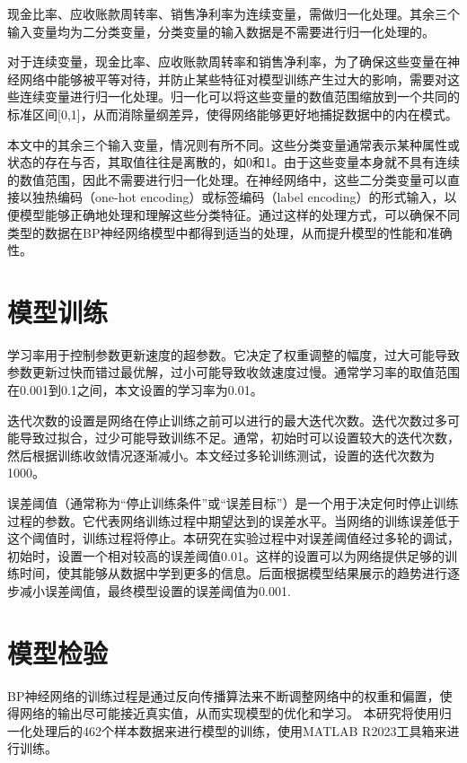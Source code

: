 现金比率、应收账款周转率、销售净利率为连续变量，需做归一化处理。其余三个输入变量均为二分类变量，分类变量的输入数据是不需要进行归一化处理的。

对于连续变量，现金比率、应收账款周转率和销售净利率，为了确保这些变量在神经网络中能够被平等对待，并防止某些特征对模型训练产生过大的影响，需要对这些连续变量进行归一化处理。归一化可以将这些变量的数值范围缩放到一个共同的标准区间[0,1]，从而消除量纲差异，使得网络能够更好地捕捉数据中的内在模式。

本文中的其余三个输入变量，情况则有所不同。这些分类变量通常表示某种属性或状态的存在与否，其取值往往是离散的，如0和1。由于这些变量本身就不具有连续的数值范围，因此不需要进行归一化处理。在神经网络中，这些二分类变量可以直接以独热编码（one-hot encoding）或标签编码（label encoding）的形式输入，以便模型能够正确地处理和理解这些分类特征。通过这样的处理方式，可以确保不同类型的数据在BP神经网络模型中都得到适当的处理，从而提升模型的性能和准确性。
\section{模型训练}

学习率用于控制参数更新速度的超参数。它决定了权重调整的幅度，过大可能导致参数更新过快而错过最优解，过小可能导致收敛速度过慢。通常学习率的取值范围在0.001到0.1之间，本文设置的学习率为0.01。

迭代次数的设置是网络在停止训练之前可以进行的最大迭代次数。迭代次数过多可能导致过拟合，过少可能导致训练不足。通常，初始时可以设置较大的迭代次数，然后根据训练收敛情况逐渐减小。本文经过多轮训练测试，设置的迭代次数为1000。

误差阈值（通常称为“停止训练条件”或“误差目标”）是一个用于决定何时停止训练过程的参数。它代表网络训练过程中期望达到的误差水平。当网络的训练误差低于这个阈值时，训练过程将停止。本研究在实验过程中对误差阈值经过多轮的调试，初始时，设置一个相对较高的误差阈值0.01。这样的设置可以为网络提供足够的训练时间，使其能够从数据中学到更多的信息。后面根据模型结果展示的趋势进行逐步减小误差阈值，最终模型设置的误差阈值为0.001.	


\section{模型检验}

BP神经网络的训练过程是通过反向传播算法来不断调整网络中的权重和偏置，使得网络的输出尽可能接近真实值，从而实现模型的优化和学习。
本研究将使用归一化处理后的462个样本数据来进行模型的训练，使用MATLAB R2023工具箱来进行训练。

